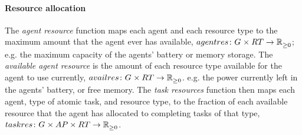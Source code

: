 \paragraph{Resource allocation}
\newcommand{\functionAgentResourcesSymbol}[2]{
	\functionSymbol{agentres}
}
\newcommand{\formalAgentResources}[2]{
	\functionFormal{\functionAgentResourcesSymbol{}{}}
	{\setAgents{}{} \times \setResourceType{}{}}
	{\setRealNumbersNonNegative{}{}}
}
\newcommand{\functionAgentResources}[2]{
	\functionSignature{\functionAgentResourcesSymbol{}{}}{\varAgent{#1}{}, \varResourceType{#2}{}}
}
\newcommand{\functionAgentResourcesEnergy}[2]{
	\functionSignature{\functionAgentResourcesSymbol{}{}}{\varAgent{}{}, \varResourceType{e}{}}
}
\newcommand{\functionAgentAvailableResourcesSymbol}[2]{
	\functionSymbol{availres}{#1}{#2}
}
\newcommand{\formalAgentAvailableResources}[2]{
	\functionFormal{\functionAgentAvailableResourcesSymbol{}{}}
	{\setAgents{}{} \times \setResourceType{}{}}
	{\setRealNumbersNonNegative{}{}}
}
\newcommand{\functionAgentAvailableResources}[2]{
	\functionSignature{\functionAgentAvailableResourcesSymbol{}{}}
	{\varAgent{#1}{}, \varResourceType{#2}{}}
}

\newcommand{\functionTaskPathEnergyAvailable}[2]{
	\functionSignature{\functionResourceAvailableSymbol{}{}}
	{\functionTaskArc{}{}, \varResourceTypeEnergy{}{}}
}
\newcommand{\functionTaskResourceAllocationSymbol}[2]{
	\functionSymbol{taskres}{#1}{#2}
}
\newcommand{\formalTaskResourceAllocation}[2]{
	\functionFormal{\functionTaskResourceAllocationSymbol{}{}}
	{\setAgents{}{} \times \setAtomicTaskType{}{} \times \setResourceType{}{} }
	{\setRealNumbersNonNegative{}{}}
}
\newcommand{\functionTaskResourceAllocation}[2]{
	\functionSignature{\functionTaskResourceAllocationSymbol{}{}}
	{\varAgent{}{}, \varAtomicTaskType{}{}, \varResourceType{}{}}
}
\newcommand{\functionTaskResourceAllocationInstance}[2]{
	\functionSignature{\functionTaskResourceAllocationSymbol{}{}}
	{\varAgent{}{}, \functionAtomicTaskMapping{\varAtomicTask{}{}}{}, \varResourceType{}{}}
}

The \textit{agent resource} function maps each agent and each resource type to the maximum amount that the agent ever has available, $\formalAgentResources{}{}$; e.g. the maximum capacity of the agents' battery or memory storage. 
The \textit{available agent resource} is the amount of each resource type available for the agent to use currently, $\formalAgentAvailableResources{}{}$. e.g. the power currently left in the agents' battery, or free memory. The \textit{task resources} function then maps each agent, type of atomic task, and resource type, to the fraction of each available resource that the agent has allocated to completing tasks of that type, $\formalTaskResourceAllocation{}{}$.

